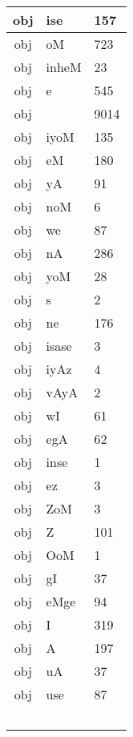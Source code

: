\documentclass[a4 paper]{article}
\begin{document}
\begin{longtable}{cp{}p{}}
obj & ise & 157\\ \midrule obj & oM & 723\\ \midrule obj & inheM & 23\\ \midrule obj & e & 545\\ \midrule obj &  & 9014\\ \midrule obj & iyoM & 135\\ \midrule obj & eM & 180\\ \midrule obj & yA & 91\\ \midrule obj & noM & 6\\ \midrule obj & we & 87\\ \midrule obj & nA & 286\\ \midrule obj & yoM & 28\\ \midrule obj & s & 2\\ \midrule obj & ne & 176\\ \midrule obj & isase & 3\\ \midrule obj & iyAz & 4\\ \midrule obj & vAyA & 2\\ \midrule obj & wI & 61\\ \midrule obj & egA & 62\\ \midrule obj & inse & 1\\ \midrule obj & ez & 3\\ \midrule obj & ZoM & 3\\ \midrule obj & Z & 101\\ \midrule obj & OoM & 1\\ \midrule obj & gI & 37\\ \midrule obj & eMge & 94\\ \midrule obj & I & 319\\ \midrule obj & A & 197\\ \midrule obj & uA & 37\\ \midrule obj & use & 87\\ \
\end{longtable}
\end{document}

